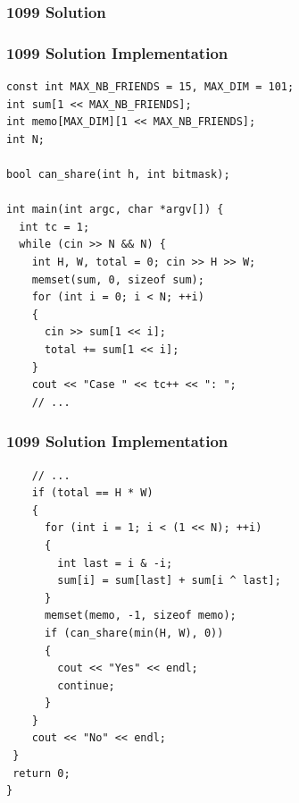 \documentclass{beamer}
\newcommand{\uvalink}[2]{UVa Online Judge (http://uva.onlinejudge.org)
  problem number \href{#2}{\textcolor{blue}{#1}.}}
\newcommand{\hint}[1]{
\begin{bclogo}[arrondi=0.1, logo=\bclampe]{Hint}
#1
\end{bclogo}
}
\newcounter{exo}
\newcommand{\exo}{
  \addtocounter{exo}{1}
  Exercice \arabic{exo}
}
\begin{document}
\fi


\ifanswers

\begin{frame}%
\frametitle{1099 Solution}

\end{frame}

\begin{frame}[fragile]
\frametitle{1099 Solution Implementation}

\scriptsize
\begin{lstlisting}
const int MAX_NB_FRIENDS = 15, MAX_DIM = 101;
int sum[1 << MAX_NB_FRIENDS];
int memo[MAX_DIM][1 << MAX_NB_FRIENDS];
int N;

bool can_share(int h, int bitmask);

int main(int argc, char *argv[]) {
  int tc = 1;
  while (cin >> N && N) {
    int H, W, total = 0; cin >> H >> W;
    memset(sum, 0, sizeof sum);
    for (int i = 0; i < N; ++i)
    {
      cin >> sum[1 << i];
      total += sum[1 << i];
    }
    cout << "Case " << tc++ << ": ";
    // ...
\end{lstlisting}

\end{frame}

\begin{frame}[fragile]
\frametitle{1099 Solution Implementation}

\scriptsize
\begin{lstlisting}
    // ...
    if (total == H * W)
    {
      for (int i = 1; i < (1 << N); ++i)
      {
        int last = i & -i;
        sum[i] = sum[last] + sum[i ^ last];
      }
      memset(memo, -1, sizeof memo);
      if (can_share(min(H, W), 0))
      {
        cout << "Yes" << endl;
        continue;
      }
    }
    cout << "No" << endl;
 }
 return 0;
}
\end{lstlisting}

\end{frame}
\end{document}
